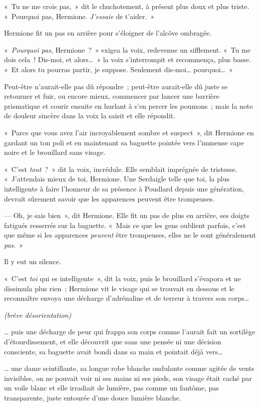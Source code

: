 «~Tu ne me crois pas,~» dit le chuchotement, à présent plus doux et plus triste.
«~Pourquoi pas, Hermione.
\emph{J'essaie} de t'aider.~»

Hermione fit un pas en arrière pour s'éloigner de l'alcôve ombragée.

«~\emph{Pourquoi pas}, Hermione~?~»
exigea la voix, redevenue un sifflement.
«~Tu me dois cela~!
Dis-moi, et alors…~»
la voix s'interrompit et recommença, plus basse.
«~Et alors tu pourras partir, je suppose.
Seulement dis-moi… pourquoi…~»

Peut-être n'aurait-elle pas dû répondre~; peut-être aurait-elle dû juste se retourner et fuir, ou encore mieux, commencer par lancer une barrière prismatique et courir ensuite en hurlant à s'en percer les poumons~; mais la note de douleur sincère dans la voix la saisit et elle répondit.

«~Parce que vous avez l'air incroyablement sombre et suspect~», dit Hermione en gardant un ton poli et en maintenant sa baguette pointée vers l'immense cape noire et le brouillard sans visage.

«~C'est \emph{tout}~?~»
dit la voix, incrédule.
Elle semblait imprégnée de tristesse.
«~J'attendais mieux de toi, Hermione.
Une Serdaigle telle que toi, la plus intelligente à faire l'honneur de sa présence à Poudlard depuis une génération, devrait sûrement savoir que les apparences peuvent être trompeuses.

--- Oh, je sais bien~», dit Hermione.
Elle fit un pas de plus en arrière, ses doigts fatigués resserrés sur la baguette.
«~Mais ce que les gens oublient parfois, c'est que même si les apparences \emph{peuvent} être trompeuses, elles ne le sont généralement \emph{pas}.~»

Il y eut un silence.

«~C'est \emph{toi} qui es intelligente~», dit la voix, puis le brouillard s'évapora et ne dissimula plus rien~; Hermione vit le visage qui se trouvait en dessous et le reconnaître envoya une décharge d'adrénaline et de terreur à travers son corps…

\emph{(brève désorientation)}

… puis une décharge de peur qui frappa son corps comme l'aurait fait un sortilège d'étourdissement, et elle découvrit que sans une pensée ni une décision consciente, sa baguette avait bondi dans sa main et pointait déjà vers…

… une dame scintillante, sa longue robe blanche ondulante comme agitée de vents invisibles, on ne pouvait voir ni ses mains ni ses pieds, son visage était caché par un voile blanc et elle irradiait de lumière, pas comme un fantôme, pas transparente, juste entourée d'une douce lumière blanche.

